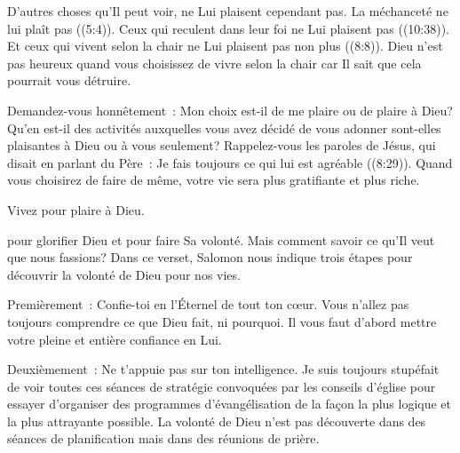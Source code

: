 
D'autres choses qu'Il peut voir, ne Lui plaisent cependant pas.
 La méchanceté ne lui plaît pas ((5:4)).
 Ceux qui reculent dans leur foi ne Lui plaisent pas ((10:38)).
 Et ceux qui vivent selon la chair ne Lui plaisent pas non plus
 ((8:8)).
 Dieu n'est pas heureux quand vous choisissez de vivre selon la chair
 car Il sait que cela pourrait vous détruire. 

Demandez-vous honnêtement~:
 Mon choix est-il de me plaire ou de plaire à Dieu?
 Qu'en est-il des activités auxquelles vous avez décidé de vous adonner
 \ocadr sont-elles plaisantes à Dieu ou à vous seulement?
 Rappelez-vous les paroles de Jésus, qui disait en parlant du Père~:
 \og Je fais toujours ce qui lui est agréable \fg{} ((8:29)).
 Quand vous choisirez de faire de même,
 votre vie sera plus gratifiante et plus riche. 

Vivez pour plaire à Dieu. 

\dvrule






 pour glorifier Dieu et pour faire Sa volonté.
 Mais comment savoir ce qu'Il veut que nous fassions?
 Dans ce verset, Salomon nous indique trois étapes pour découvrir
 la volonté de Dieu pour nos vies. 

Premièrement~: \og Confie-toi en l'Éternel de tout ton c\oe{}ur. \fg{}
 Vous n'allez pas toujours comprendre ce que Dieu fait, ni pourquoi.
 Il vous faut d'abord mettre votre pleine et entière confiance en Lui. 

Deuxièmement~: \og Ne t'appuie pas sur ton intelligence. \fg{}
 Je suis toujours stupéfait de voir toutes ces séances de stratégie
 convoquées par les conseils d'église pour essayer d'organiser
 des programmes d'évangélisation de la façon la plus logique
 et la plus attrayante possible.
 La volonté de Dieu n'est pas découverte dans des séances
 de planification mais dans des réunions de prière. 

